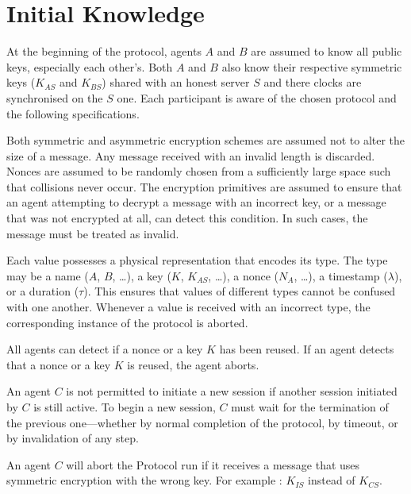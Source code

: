 \section{Initial Knowledge}
At the beginning of the protocol, agents $A$ and $B$ are assumed to know all public keys, especially each other’s.
Both $A$ and $B$ also know their respective symmetric keys ($K_{AS}$ and $K_{BS}$) shared with an honest server $S$
and there clocks are synchronised on the $S$ one. 
Each participant is aware of the chosen protocol and the following specifications.

\vspace{1cm}

Both symmetric and asymmetric encryption schemes are assumed not to alter the size of a message.
Any message received with an invalid length is discarded.
Nonces are assumed to be randomly chosen from a sufficiently large space such that collisions never occur.
The encryption primitives are assumed to ensure that an agent attempting to decrypt a message with an incorrect key,
or a message that was not encrypted at all, can detect this condition.
In such cases, the message must be treated as invalid.

\vspace{1cm}

Each value possesses a physical representation that encodes its type.
The type may be a name ($A$, $B$, …), a key ($K$, $K_{AS}$, …), a nonce ($N_{A}$, …), a timestamp ($\lambda$), or a duration ($\tau$).
This ensures that values of different types cannot be confused with one another.
Whenever a value is received with an incorrect type, the corresponding instance of the protocol is aborted.

\vspace{1cm}

All agents can detect if a nonce or a key $K$ has been reused. If an agent detects that a nonce or a key $K$ is reused, the agent aborts.

\vspace{1cm}

An agent $C$ is not permitted to initiate a new session if another session initiated by $C$ is still active.
To begin a new session, $C$ must wait for the termination of the previous one—whether by normal completion of the protocol, by timeout, or by invalidation of any step.

\vspace{1cm}

An agent $C$ will abort the Protocol run if it receives a message that uses symmetric encryption with the wrong key. For example : $K_{IS}$ instead of $K_{CS}$.
